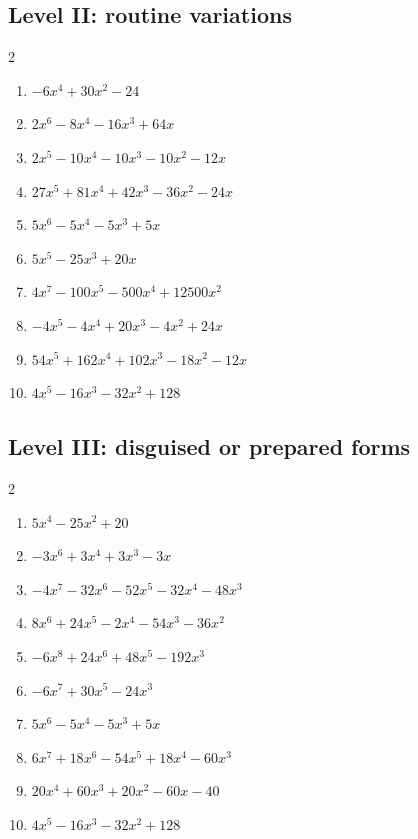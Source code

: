 \documentclass[11pt,oneside]{book}
\begin{document}
\subsection*{Level II: routine variations}
\begin{multicols}{2}
\begin{enumerate}[leftmargin=*,label=\textbf{\arabic*.},itemsep=0.65\baselineskip]
\item $ - 6 x^{4} + 30 x^{2} - 24 $
\item $ 2 x^{6} - 8 x^{4} - 16 x^{3} + 64 x $
\item $ 2 x^{5} - 10 x^{4} - 10 x^{3} - 10 x^{2} - 12 x $
\item $ 27 x^{5} + 81 x^{4} + 42 x^{3} - 36 x^{2} - 24 x $
\item $ 5 x^{6} - 5 x^{4} - 5 x^{3} + 5 x $
\item $ 5 x^{5} - 25 x^{3} + 20 x $
\item $ 4 x^{7} - 100 x^{5} - 500 x^{4} + 12500 x^{2} $
\item $ - 4 x^{5} - 4 x^{4} + 20 x^{3} - 4 x^{2} + 24 x $
\item $ 54 x^{5} + 162 x^{4} + 102 x^{3} - 18 x^{2} - 12 x $
\item $ 4 x^{5} - 16 x^{3} - 32 x^{2} + 128 $
\end{enumerate}
\end{multicols}
\subsection*{Level III: disguised or prepared forms}
\begin{multicols}{2}
\begin{enumerate}[leftmargin=*,label=\textbf{\arabic*.},itemsep=0.65\baselineskip]
\item $ 5 x^{4} - 25 x^{2} + 20 $
\item $ - 3 x^{6} + 3 x^{4} + 3 x^{3} - 3 x $
\item $ - 4 x^{7} - 32 x^{6} - 52 x^{5} - 32 x^{4} - 48 x^{3} $
\item $ 8 x^{6} + 24 x^{5} - 2 x^{4} - 54 x^{3} - 36 x^{2} $
\item $ - 6 x^{8} + 24 x^{6} + 48 x^{5} - 192 x^{3} $
\item $ - 6 x^{7} + 30 x^{5} - 24 x^{3} $
\item $ 5 x^{6} - 5 x^{4} - 5 x^{3} + 5 x $
\item $ 6 x^{7} + 18 x^{6} - 54 x^{5} + 18 x^{4} - 60 x^{3} $
\item $ 20 x^{4} + 60 x^{3} + 20 x^{2} - 60 x - 40 $
\item $ 4 x^{5} - 16 x^{3} - 32 x^{2} + 128 $
\end{enumerate}
\end{multicols}
\end{document}

